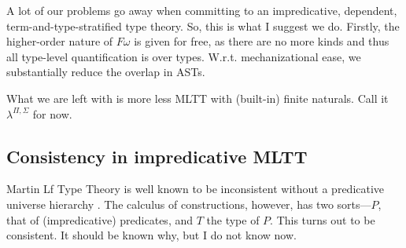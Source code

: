 \documentclass[12pt]{article}
\begin{document}
A lot of our problems go away when committing to an impredicative, dependent, term-and-type-stratified type theory. So, this is what I suggest we do. Firstly, the higher-order nature of $F\omega$ is given for free, as there are no more kinds and thus all type-level quantification is over types. W.r.t. mechanizational ease, we substantially reduce the overlap in ASTs. 

What we are left with is more less MLTT with (built-in) finite naturals. Call it $\lambda^{\Pi,\Sigma}$ for now.

\subsection{Consistency in impredicative MLTT}

Martin Lf Type Theory is well known to be inconsistent without a predicative universe hierarchy \citet{Hurkens95, MonnierN19, Coquand92}. The calculus of constructions, however, has two sorts---$P$, that of (impredicative) predicates, and $T$ the type of $P$. This turns out to be consistent. It should be known why, but I do not know now.
\end{document}
